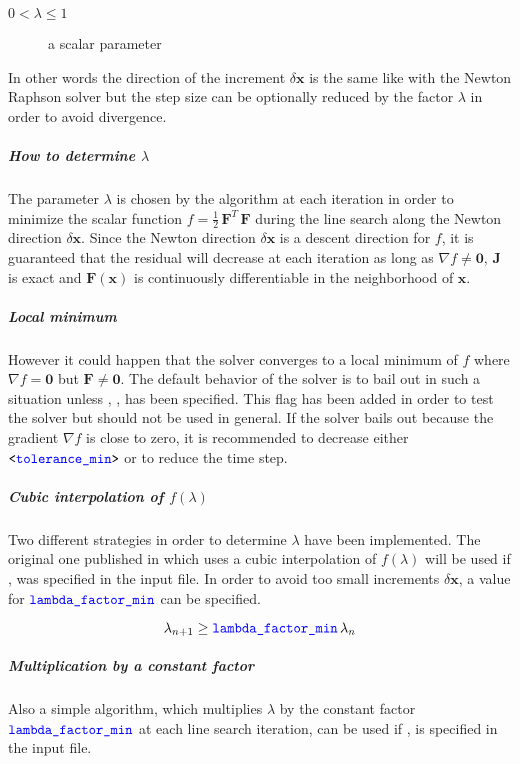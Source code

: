 \begin{description}
\item[$0 < \lambda \le 1$] a scalar parameter
\end{description}

In other words the direction of the increment $\delta\boldsymbol{x}$ is the same like with the Newton Raphson solver but the step size can be optionally reduced by the factor $\lambda$ in order to avoid divergence.

\subparagraph{How to determine $\lambda$}
The parameter $\lambda$ is chosen by the algorithm at each iteration in order to minimize the scalar function $f=\frac{1}{2}\,\boldsymbol{F}^T\,\boldsymbol{F}$ during the line search along the Newton direction $\delta\boldsymbol{x}$. Since the Newton direction $\delta\boldsymbol{x}$ is a descent direction for $f$, it is guaranteed that the residual will decrease at each iteration as long as $\nabla f \neq \boldsymbol{0}$, $\boldsymbol{J}$ is exact and $\boldsymbol{F}\left(\boldsymbol{x}\right)$ is continuously differentiable in the neighborhood of $\boldsymbol{x}$.

\subparagraph{Local minimum}
However it could happen that the solver converges to a local minimum of $f$ where $\nabla f = \boldsymbol{0}$ but $\boldsymbol{F} \neq \boldsymbol{0}$.
The default behavior of the solver is to bail out in such a situation unless , ,  has been specified. This flag has been added in order to test the solver but should not be used in general. If the solver bails out because the gradient $\nabla f$ is close to zero, it is recommended to decrease either $\texttt{<\textcolor{blue}{tolerance\_min}>}$ or to reduce the time step.

\subparagraph{Cubic interpolation of $f\left(\lambda\right)$}
Two different strategies in order to determine $\lambda$ have been implemented.
The original one published in \cite{NUMERICAL-RECIPES-IN-C} which uses a cubic interpolation of $f\left(\lambda\right)$ will be used if ,  was specified in the input file.
In order to avoid too small increments $\delta\boldsymbol{x}$, a value for $\textcolor{blue}{\texttt{lambda\_factor\_min}}$ can be specified.

\begin{equation}
\lambda_{n+1} \geq \textcolor{blue}{\texttt{lambda\_factor\_min}} \, \lambda_{n}
\end{equation}

\subparagraph{Multiplication by a constant factor}
Also a simple algorithm, which multiplies $\lambda$ by the constant factor $\textcolor{blue}{\texttt{lambda\_factor\_min}}$ at each line search iteration, can be used if ,  is specified in the input file.

